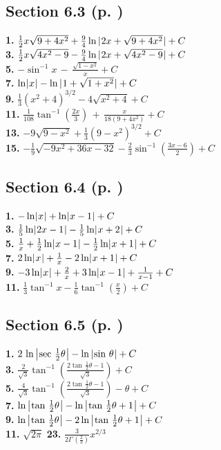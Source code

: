 \begin{multicols*}{2}
\subsection*{Section 6.3 (p. \pageref{sec6dot3})}
\textbf{1.} $\frac{1}{2} x \sqrt{9+4x^2} + \frac{9}{4} \ln\,\lvert\mspace{1mu}2x + \sqrt{9+4x^2}\mspace{1mu}\rvert + C$\\
\textbf{3.} $\frac{1}{2} x \sqrt{4x^2 - 9} - \frac{9}{4} \ln\,\lvert\mspace{1mu}2x + \sqrt{4x^2 - 9}\mspace{1mu}\rvert + C$\\
\textbf{5.} $-\sin^{-1} x \,-\, \frac{\sqrt{1-x^2}}{x} + C$\\
\textbf{7.} $\ln \lvert\mspace{1mu}x\mspace{1mu}\rvert - \ln\,\lvert\mspace{1mu}1 + \sqrt{1+x^2}\mspace{1mu}\rvert + C$\\
\textbf{9.} $\frac{1}{3} (x^2 + 4)^{3/2} - 4\sqrt{x^2 + 4} + C$\\
\textbf{11.} $\frac{1}{108} \tan^{-1} \left(\frac{2x}{3}\right) \,+\, \frac{x}{18(9+4x^2)} + C$\\
\textbf{13.} $-9 \sqrt{9-x^2} + \frac{1}{3}(9 - x^2)^{3/2} + C$\\
\textbf{15.} $-\frac{1}{9} \sqrt{-9x^2+36x-32} - \frac{2}{3} \sin^{-1} \left(\frac{3x-6}{2}\right) + C$
\subsection*{Section 6.4 (p. \pageref{sec6dot4})}
\textbf{1.} $-\ln \lvert\mspace{1mu}x\mspace{1mu}\rvert + \ln \lvert\mspace{1mu}x-1\mspace{1mu}\rvert + C$\\
\textbf{3.} $\frac{1}{5}\ln \lvert\mspace{1mu}2x-1\mspace{1mu}\rvert - \frac{1}{5}\ln \lvert\mspace{1mu}x+2\mspace{1mu}\rvert + C$\\
\textbf{5.} $\frac{1}{x} + \frac{1}{2}\ln \lvert\mspace{1mu}x-1\mspace{1mu}\rvert - \frac{1}{2}\ln \lvert\mspace{1mu}x+1\mspace{1mu}\rvert + C$\\
\textbf{7.} $2\ln \lvert\mspace{1mu}x\mspace{1mu}\rvert + \frac{1}{x} - 2\ln \lvert\mspace{1mu}x+1\mspace{1mu}\rvert + C$\\
\textbf{9.} $-3\ln \lvert\mspace{1mu}x\mspace{1mu}\rvert + \frac{2}{x} + 3\ln \lvert\mspace{1mu}x-1\mspace{1mu}\rvert + \frac{1}{x-1} + C$\\
\textbf{11.} $\frac{1}{3}\tan^{-1}x - \frac{1}{6}\tan^{-1}\left(\frac{x}{2}\right) + C$
\subsection*{Section 6.5 (p. \pageref{sec6dot5})}
\textbf{1.} $2\,\ln\,\bigl\lvert\mspace{1mu}\sec\,\tfrac{1}{2}\theta\mspace{1mu}\bigr\rvert - \ln\,\lvert\mspace{1mu}\sin\,\theta\mspace{1mu}\rvert + C$\\
\textbf{3.} $\frac{2}{\sqrt{3}}\tan^{-1}\left(\frac{2\tan\,\tfrac{1}{2}\theta - 1}{\sqrt{3}}\right) + C$\\
\textbf{5.} $\frac{4}{\sqrt{3}}\tan^{-1}\left(\frac{2\tan\,\tfrac{1}{2}\theta - 1}{\sqrt{3}}\right) - \theta + C$\\
\textbf{7.} $\ln\,\bigl\lvert\mspace{1mu}\tan\,\tfrac{1}{2}\theta\mspace{1mu}\bigr\rvert - \ln\,\bigl\lvert\mspace{1mu}\tan\,\tfrac{1}{2}\theta + 1\mspace{1mu}\bigr\rvert + C$\\
\textbf{9.} $\ln\,\bigl\lvert\mspace{1mu}\tan\,\tfrac{1}{2}\theta\mspace{1mu}\bigr\rvert - 2\ln\,\bigl\lvert\mspace{1mu}\tan\,\tfrac{1}{2}\theta + 1\mspace{1mu}\bigr\rvert + C$\\
\textbf{11.} $\sqrt{2\pi}$ \quad
\textbf{23.} $\frac{3}{2\Gamma\,\left(\frac{2}{3}\right)}x^{2/3}$

\end{multicols*}
